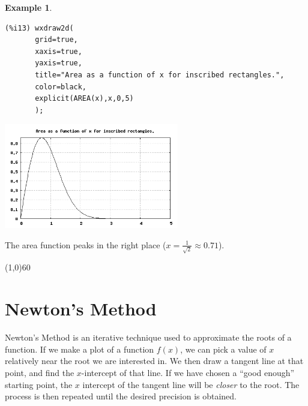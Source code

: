 \documentclass[10.5pt,twoside]{report}
\theoremstyle{definition}
\newtheorem{exmp}{Example}[section]
\begin{document}
\begin{exmp}
\begin{verbatim}
(%i13) wxdraw2d(
       grid=true,
       xaxis=true,
       yaxis=true,
       title="Area as a function of x for inscribed rectangles.",
       color=black,
       explicit(AREA(x),x,0,5)
       );
\end{verbatim}

\includegraphics[width=3in]{example_5_3_2_2}

The area function peaks in the right place ($x= \frac{1}{\sqrt{2}} \approx 0.71$).


\end{exmp}

\line(1,0){60}
\linethickness{0.5mm}

\pagebreak

\section{Newton's Method}\label{Newton's Method}

Newton's Method is an iterative technique used to approximate the roots of a function.  If we make a plot of a function $f(x)$, we can pick a value of $x$ relatively near the root we are interested in.  We then draw a tangent line at that point, and find the $x$-intercept of that line.  If we have chosen a ``good enough'' starting point, the $x$ intercept of the tangent line will be \textit{closer} to the root.  The process is then repeated until the desired precision is obtained. 
\end{document}
